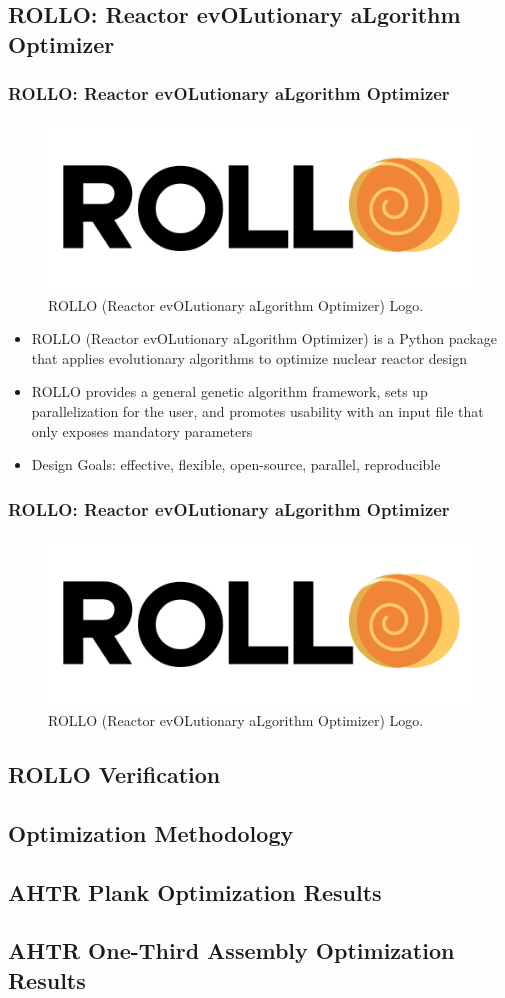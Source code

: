 \subsection{ROLLO: Reactor evOLutionary aLgorithm Optimizer}
\begin{frame}
    \frametitle{ROLLO: Reactor evOLutionary aLgorithm Optimizer}
    \begin{figure}
        \includegraphics[width=0.5\linewidth]{figures/rollo-logo.png} 
        \caption{ROLLO (Reactor evOLutionary aLgorithm Optimizer) Logo.}
    \end{figure}
        \begin{itemize}
            \item ROLLO (Reactor evOLutionary aLgorithm Optimizer) is a Python package 
            that applies evolutionary algorithms to optimize nuclear reactor design
            \item ROLLO provides a general genetic algorithm framework, sets up 
            parallelization for the user, and promotes usability with an input file that
            only exposes mandatory parameters
            \item Design Goals: effective, flexible, open-source, parallel,
            reproducible
        \end{itemize}
\end{frame}

\begin{frame}
    \frametitle{ROLLO: Reactor evOLutionary aLgorithm Optimizer}
    \begin{minipage}[c]{\textwidth}
        \centering
        \begin{figure}
            \includegraphics[width=0.5\linewidth]{figures/rollo-logo.png} 
            \caption{ROLLO (Reactor evOLutionary aLgorithm Optimizer) Logo.}
        \end{figure}
    \end{minipage}
\end{frame}

\subsection{ROLLO Verification}
\subsection{Optimization Methodology}
\subsection{AHTR Plank Optimization Results}
\subsection{AHTR One-Third Assembly Optimization Results}